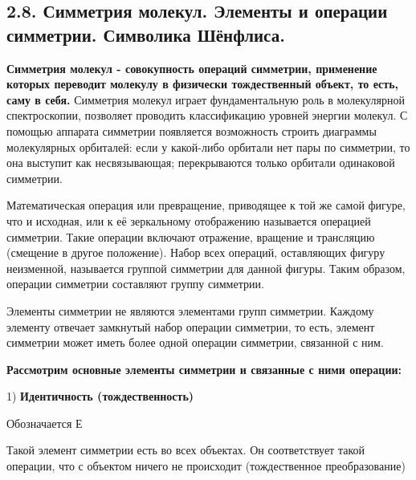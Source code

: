 
\subsection{2.8. Симметрия молекул. Элементы и операции симметрии. Символика Шёнфлиса.} 

\par\bigskip
	
\textbf{Симметрия молекул - совокупность операций симметрии,
	применение которых переводит молекулу в физически
	тождественный объект, то есть, саму в себя.} Симметрия молекул
играет фундаментальную роль в молекулярной спектроскопии,
позволяет проводить классификацию уровней энергии молекул. С
помощью аппарата симметрии появляется возможность строить
диаграммы молекулярных орбиталей: если у какой-либо орбитали
нет пары по симметрии, то она выступит как несвязывающая;
перекрываются только орбитали одинаковой симметрии.

\par\smallskip

Математическая операция или превращение, приводящее к той же
самой фигуре, что и исходная, или к её зеркальному отображению
называется операцией симметрии. Такие операции включают
отражение, вращение и трансляцию (смещение в другое
положение). Набор всех операций, оставляющих фигуру
неизменной, называется группой симметрии для данной фигуры.
Таким образом, операции симметрии составляют группу
симметрии.

\par\smallskip

Элементы симметрии не являются элементами групп симметрии.
Каждому элементу отвечает замкнутый набор операции симметрии,
то есть, элемент симметрии может иметь более одной операции
симметрии, связанной с ним.

\begin{center}
\textbf{Рассмотрим основные элементы симметрии и связанные с ними
	операции:}
\end{center}

1) \textbf{Идентичность (тождественность)}

\par\smallskip

Обозначается Е

\par\smallskip

Такой элемент симметрии есть во всех объектах. Он
соответствует такой операции, что с объектом ничего не
происходит (тождественное преобразование)

\par\smallskip

